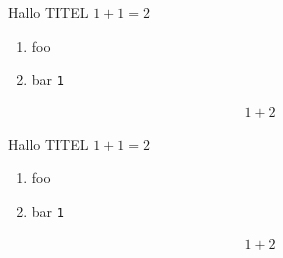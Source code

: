 \documentclass[parskip=full]{scrartcl}
\begin{document}
\begin{xframed}
\centering
Hallo TITEL $1+1=2$
\xframedendhead
\begin{enumerate}
\item foo%
\item bar \verb+1+
\end{enumerate}
\lipsum[1]
\lipsum[1]
\begin{align}
1+2
\end{align}
\end{xframed}
\lipsum[1]
\clearpage
\begin{xframed}
\centering
Hallo TITEL $1+1=2$
\xframedendhead
\begin{enumerate}
\item foo%
\item bar \verb+1+
\end{enumerate}
\lipsum[1]
\begin{align}
1+2
\end{align}
\end{xframed}
\end{document}
